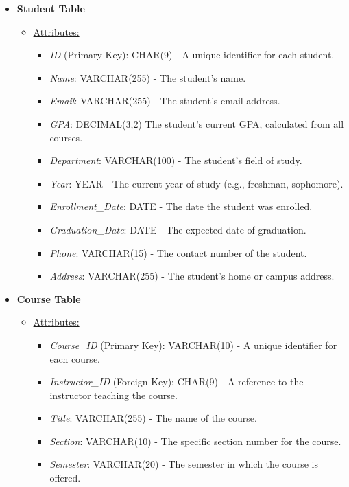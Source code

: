 \documentclass[12pt]{article}
\begin{document}
\begin{itemize}
    \item \textbf{Student Table}
    \begin{itemize}
        \item \underline{Attributes:}
        \begin{itemize}
            \item \textit{ID} (Primary Key): CHAR(9) - A unique identifier for each student.
            \item \textit{Name}: VARCHAR(255) - The student's name.
            \item \textit{Email}: VARCHAR(255) - The student's email address.
            \item \textit{GPA}: DECIMAL(3,2) The student's current GPA, calculated from all courses.
            \item \textit{Department}: VARCHAR(100) - The student's field of study.
            \item \textit{Year}: YEAR - The current year of study (e.g., freshman, sophomore).
            \item \textit{Enrollment\_Date}: DATE - The date the student was enrolled.
            \item \textit{Graduation\_Date}: DATE - The expected date of graduation.
            \item \textit{Phone}: VARCHAR(15) - The contact number of the student.
            \item \textit{Address}: VARCHAR(255) - The student's home or campus address.
        \end{itemize}
    \end{itemize}
    \pagebreak
    \item \textbf{Course Table}
    \begin{itemize}
        \item \underline{Attributes:}
        \begin{itemize}
            \item \textit{Course\_ID} (Primary Key): VARCHAR(10) - A unique identifier for each course.
            \item \textit{Instructor\_ID} (Foreign Key): CHAR(9) - A reference to the instructor teaching the course.
            \item \textit{Title}: VARCHAR(255) - The name of the course.
            \item \textit{Section}: VARCHAR(10) - The specific section number for the course.
            \item \textit{Semester}: VARCHAR(20) - The semester in which the course is offered.

\end{itemize}
\end{itemize}
\end{itemize}
\end{document}
